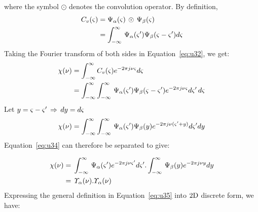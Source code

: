\noindent where the symbol $\odot$ denotes the convolution operator. By definition,
\begin{equation}
 \begin{aligned}
  C_{v}(\varsigma) &=  \Psi_{\rm \alpha}(\varsigma) \,\odot \,  \Psi_{\rm \beta}(\varsigma)\\
  &= \int_{- \infty}^{\infty}\,  \Psi_{\rm \alpha}(\varsigma')  \Psi_{\rm \beta}(\varsigma - \varsigma') \mathnormal{d\varsigma} 
  \end{aligned}
  \label{eq:u32}
\end{equation}
%
Taking the Fourier transform of both sides in Equation~\ref{eq:u32}, we get:
\begin{equation}
\begin{aligned}
 \chi(\nu) &= \int_{- \infty}^{\infty} C_{v}(\varsigma)\mathnormal{e}^{-2\pi j \nu \varsigma}\mathnormal{d\varsigma}\\
 &= \int_{- \infty}^{\infty} \int_{- \infty}^{\infty} \,
  \Psi_{\rm \alpha}(\varsigma')  \Psi_{\rm \beta}(\varsigma - \varsigma')\mathnormal{e}^{-2\pi j \nu \varsigma}\mathnormal{d\varsigma'\, d\varsigma}
 \end{aligned}
   \label{eq:u33}
\end{equation}
%
Let $ y = \varsigma - \varsigma' \, \Rightarrow \, \mathnormal{dy} = \mathnormal{d\varsigma} $
\begin{equation}
  \chi(\nu) =  \int_{- \infty}^{\infty} \int_{- \infty}^{\infty} \,   \Psi_{\rm \alpha}(\varsigma')  \Psi_{\rm \beta}(y)\mathnormal{e}^{-2\pi j\nu(\varsigma' + y)}
  \mathnormal{d\varsigma'} \mathnormal{dy}
   \label{eq:u34}
\end{equation}
%
Equation~\ref{eq:u34} can therefore be separated to give:

\begin{equation}
 \begin{aligned}
  \chi(\nu)  & =\,  \int_{- \infty}^{\infty} \,   \Psi_{\rm \alpha}(\varsigma')\mathnormal{e}^{-2\pi j \nu \varsigma'} \mathnormal{d\varsigma'}.
  \int_{- \infty}^{\infty} \,  \Psi_{\rm \beta}(y)\mathnormal{e}^{-2\pi j \nu y} \mathnormal{dy} \\
   & =\,  \varUpsilon_{\rm \alpha}(\nu). \varUpsilon_{\rm \alpha}(\nu)
\end{aligned}
\label{eq:u35}
\end{equation}
%
Expressing the general definition in Equation~\ref{eq:u35} into $\rm 2D$ discrete form, we have:

